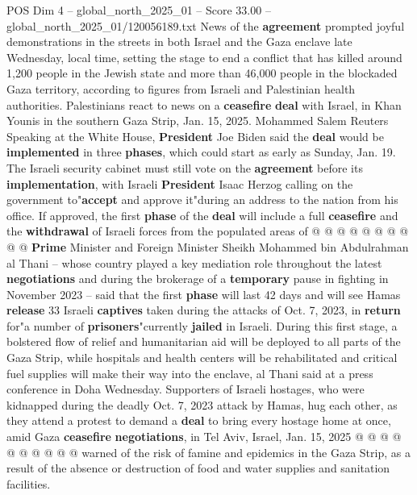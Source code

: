 \begin{textsample}{POS Dim 4 – global\_north\_2025\_01 – Score 33.00 – global\_north\_2025\_01/120056189.txt}  \label{ex:f4_pos_042}
News of the \textbf{agreement} prompted joyful demonstrations in the streets in both Israel and the Gaza enclave late Wednesday, local time, setting the stage to end a conflict that has killed around 1,200 people in the Jewish state and more than 46,000 people in the blockaded Gaza territory, according to figures from Israeli and Palestinian health authorities.
Palestinians react to news on a \textbf{ceasefire} \textbf{deal} with Israel, in Khan Younis in the southern Gaza Strip, Jan. 15, 2025.
Mohammed Salem Reuters Speaking at the White House, \textbf{President} Joe Biden said the \textbf{deal} would be \textbf{implemented} in three \textbf{phases}, which could start as early as Sunday, Jan. 19.
The Israeli security cabinet must still vote on the \textbf{agreement} before its \textbf{implementation}, with Israeli \textbf{President} Isaac Herzog calling on the government to"\textbf{accept} and approve it"during an address to the nation from his office.
If approved, the first \textbf{phase} of the \textbf{deal} will include a full \textbf{ceasefire} and the \textbf{withdrawal} of Israeli forces from the populated areas of @ @ @ @ @ @ @ @ @ @ \textbf{Prime} Minister and Foreign Minister Sheikh Mohammed bin Abdulrahman al Thani -- whose country played a key mediation role throughout the latest \textbf{negotiations} and during the brokerage of a \textbf{temporary} pause in fighting in November 2023 -- said that the first \textbf{phase} will last 42 days and will see Hamas \textbf{release} 33 Israeli \textbf{captives} taken during the attacks of Oct. 7, 2023, in \textbf{return} for"a number of \textbf{prisoners}"currently \textbf{jailed} in Israeli.
During this first stage, a bolstered flow of relief and humanitarian aid will be deployed to all parts of the Gaza Strip, while hospitals and health centers will be rehabilitated and critical fuel supplies will make their way into the enclave, al Thani said at a press conference in Doha Wednesday.
Supporters of Israeli hostages, who were kidnapped during the deadly Oct. 7, 2023 attack by Hamas, hug each other, as they attend a protest to demand a \textbf{deal} to bring every hostage home at once, amid Gaza \textbf{ceasefire} \textbf{negotiations}, in Tel Aviv, Israel, Jan. 15, 2025 @ @ @ @ @ @ @ @ @ @ warned of the risk of famine and epidemics in the Gaza Strip, as a result of the absence or destruction of food and water supplies and sanitation facilities.

\end{textsample}
